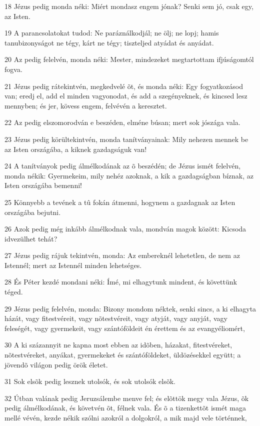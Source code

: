 \par 18 Jézus pedig monda néki: Miért mondasz engem jónak? Senki sem jó, csak egy, az Isten.
\par 19 A parancsolatokat tudod: Ne paráználkodjál; ne ölj; ne lopj; hamis tanubizonyságot ne tégy, kárt ne tégy; tiszteljed atyádat és anyádat.
\par 20 Az pedig felelvén, monda néki: Mester, mindezeket megtartottam ifjúságomtól fogva.
\par 21 Jézus pedig rátekintvén, megkedvelé õt, és monda néki: Egy fogyatkozásod van; eredj el, add el minden vagyonodat, és add a szegényeknek, és kincsed lesz mennyben; és jer, kövess engem, felvévén a keresztet.
\par 22 Az pedig elszomorodván e beszéden, elméne búsan; mert sok jószága vala.
\par 23 Jézus pedig körültekintvén, monda tanítványainak: Mily nehezen mennek be az Isten országába, a kiknek gazdagságuk van!
\par 24 A tanítványok pedig álmélkodának az õ beszédén; de Jézus ismét felelvén, monda nékik: Gyermekeim, mily nehéz azoknak, a kik a gazdagságban bíznak, az Isten országába bemenni!
\par 25 Könnyebb a tevének a tû fokán átmenni, hogynem a gazdagnak az Isten országába bejutni.
\par 26 Azok pedig még inkább álmélkodnak vala, mondván magok között: Kicsoda idvezülhet tehát?
\par 27 Jézus pedig rájuk tekintvén, monda: Az embereknél lehetetlen, de nem az Istennél; mert az Istennél minden lehetséges.
\par 28 És Péter kezdé mondani néki: Ímé, mi elhagytunk mindent, és követtünk téged.
\par 29 Jézus pedig felelvén, monda: Bizony mondom néktek, senki sincs, a ki elhagyta házát, vagy fitestvéreit, vagy nõtestvéreit, vagy atyját, vagy anyját, vagy feleségét, vagy gyermekeit, vagy szántóföldeit én érettem és az evangyéliomért,
\par 30 A ki százannyit ne kapna most ebben az idõben, házakat, fitestvéreket, nõtestvéreket, anyákat, gyermekeket és szántóföldeket, üldözésekkel együtt; a jövendõ világon pedig örök életet.
\par 31 Sok elsõk pedig lesznek utolsók, és sok utolsók elsõk.
\par 32 Útban valának pedig Jeruzsálembe menve fel; és elõttök megy vala Jézus, õk pedig álmélkodának, és követvén õt, félnek vala. És õ a tizenkettõt ismét maga mellé vévén, kezde nékik szólni azokról a dolgokról, a mik majd vele történnek,
